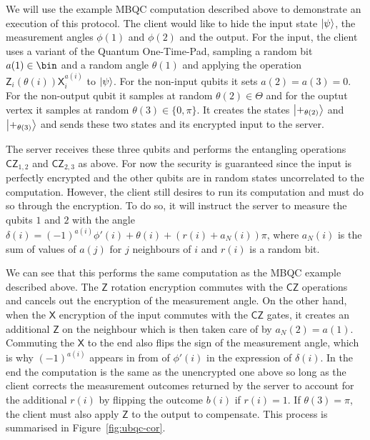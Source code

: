 \documentclass[12pt]{iopart}
\newcommand{\cptp}[1]{\mathsf{#1}} \newcommand{\pd}[1]{\mathcal{#1}}  \newcommand{\sch}[1]{\bm{#1}}
\newcommand{\X}{\cptp{X}}
\newcommand{\Z}{\cptp{Z}}
\renewcommand{\1}{\mathds{1}}
\newcommand{\CZ}{\mathsf{CZ}}
\begin{document}
We will use the example MBQC computation described above to demonstrate an execution of this protocol. The client would like to hide the input state $\ket{\psi}$, the measurement angles $\phi(1)$ and $\phi(2)$ and the output. For the input, the client uses a variant of the Quantum One-Time-Pad, sampling a random bit $a(1) \in \bin$ and a random angle $\theta(1)$ and applying the operation $\Z_i(\theta(i))\X_i^{a(i)}$ to $\ket{\psi}$. For the non-input qubits it sets $a(2) = a(3) = 0$. For the non-output qubit it samples at random $\theta(2) \in \Theta$ and for the ouptut vertex it samples at random $\theta(3) \in \{0, \pi\}$. It creates the states $\ket{+_{\theta(2)}}$ and $\ket{+_{\theta(3)}}$ and sends these two states and its encrypted input to the server.

The server receives these three qubits and performs the entangling operations $\CZ_{1, 2}$ and $\CZ_{2, 3}$ as above. For now the security is guaranteed since the input is perfectly encrypted and the other qubits are in random states uncorrelated to the computation. However, the client still desires to run its computation and must do so through the encryption. To do so, it will instruct the server to measure the qubits $1$ and $2$ with the angle $\delta(i) = (-1)^{a(i)}\phi'(i) + \theta(i) + (r(i) + a_N(i)) \pi$, where $a_N(i)$ is the sum of values of $a(j)$ for $j$ neighbours of $i$ and $r(i)$ is a random bit.

We can see that this performs the same computation as the MBQC example described above. The $\Z$ rotation encryption commutes with the $\CZ$ operations and cancels out the encryption of the measurement angle. On the other hand, when the $\X$ encryption of the input commutes with the $\CZ$ gates, it creates an additional $\Z$ on the neighbour which is then taken care of by $a_N(2) = a(1)$. Commuting the $\X$ to the end also flips the sign of the measurement angle, which is why $(-1)^{a(i)}$ appears in from of $\phi'(i)$ in the expression of $\delta(i)$. In the end the computation is the same as the unencrypted one above so long as the client corrects the measurement outcomes returned by the server to account for the additional $r(i)$ by flipping the outcome $b(i)$ if $r(i) = 1$. If $\theta(3) = \pi$, the client must also apply $\Z$ to the output to compensate. This process is summarised in Figure~\ref{fig:ubqc-cor}.
\end{document}
